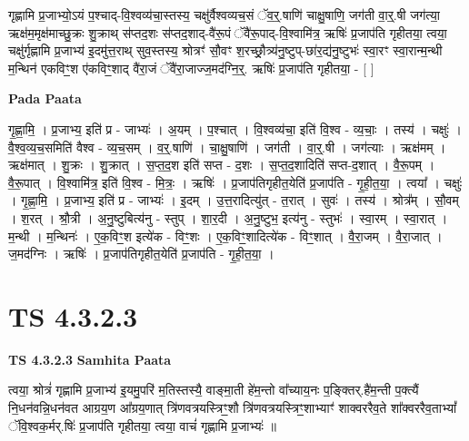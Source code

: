 \documentclass[17pt]{extarticle}
\begin{document}
गृह्णामि प्र॒जाभ्यो॒ऽयं प॒श्चाद्-वि॒श्वव्य॑चा॒स्तस्य॒ चक्षु॑र्वैश्वव्यच॒सं ॅव॒र्॒.षाणि॑ चाक्षु॒षाणि॒ जग॑ती वा॒र्॒.षी जग॑त्या॒ ऋक्ष॑म॒मृक्ष॑माच्छु॒क्रः शु॒क्राथ् स॑प्तद॒शः स॑प्तद॒शाद्-वै॑रू॒पं ॅवै॑रू॒पाद्-वि॒श्वामि॑त्र॒ ऋषिः॑ प्र॒जाप॑ति गृहीतया॒ त्वया॒ चक्षु॑र्गृह्णामि प्र॒जाभ्य॑ इ॒दमु॑त्त॒राथ् सुव॒स्तस्य॒ श्रोत्रꣳ॑ सौ॒वꣳ श॒रच्छ्रौ॒त्र्य॑नु॒ष्टुप्-छा॑र॒द्य॑नु॒ष्टुभः॑ स्वा॒रꣳ स्वा॒रान्म॒न्थी म॒न्थिन॑ एकविꣳ॒॒श ए॑कविꣳ॒॒शाद् वै॑रा॒जं ॅवै॑रा॒जाज्ज॒मद॑ग्नि॒र्॒. ऋषिः॑ प्र॒जाप॑ति गृहीतया॒ - [  ] \newline

\textbf{Pada Paata} \newline

गृ॒ह्णा॒मि॒ । प्र॒जाभ्य॒ इति॑ प्र - जाभ्यः॑ । अ॒यम् । प॒श्चात् । वि॒श्वव्य॑चा॒ इति॑ वि॒श्व - व्य॒चाः॒ । तस्य॑ । चक्षुः॑ । वै॒श्व॒व्य॒च॒समिति॑ वैश्व - व्य॒च॒सम् । व॒र्॒.षाणि॑ । चा॒क्षु॒षाणि॑ । जग॑ती । वा॒र्॒.षी । जग॑त्याः । ऋक्ष॑मम् । ऋक्ष॑मात् । शु॒क्रः । शु॒क्रात् । स॒प्त॒द॒श इति॑ सप्त - द॒शः । स॒प्त॒द॒शादिति॑ सप्त-द॒शात् । वै॒रू॒पम् । वै॒रू॒पात् । वि॒श्वामि॑त्र॒ इति॑ वि॒श्व - मि॒त्रः॒ । ऋषिः॑ । प्र॒जाप॑तिगृहीत॒येति॑ प्र॒जाप॑ति - गृ॒ही॒त॒या॒ । त्वया᳚ । चक्षुः॑ । गृ॒ह्णा॒मि॒ । प्र॒जाभ्य॒ इति॑ प्र - जाभ्यः॑ । इ॒दम् । उ॒त्त॒रादित्यु॑त् - त॒रात् । सुवः॑ । तस्य॑ । श्रोत्र᳚म् । सौ॒वम् । श॒रत् । श्रौ॒त्री । अ॒नु॒ष्टुबित्य॑नु - स्तुप् । शा॒र॒दी । अ॒नु॒ष्टुभ॒ इत्य॑नु - स्तुभः॑ । स्वा॒रम् । स्वा॒रात् । म॒न्थी । म॒न्थिनः॑ । ए॒क॒विꣳ॒॒श इत्ये॑क - विꣳ॒॒शः । ए॒क॒विꣳ॒॒शादित्ये॑क - विꣳ॒॒शात् । वै॒रा॒जम् । वै॒रा॒जात् । ज॒मद॑ग्निः । ऋषिः॑ । प्र॒जाप॑तिगृहीत॒येति॑ प्र॒जाप॑ति - गृ॒ही॒त॒या॒ ।  \newline




\section*{ TS 4.3.2.3 }

\textbf{TS 4.3.2.3 } \newline
\textbf{Samhita Paata} \newline

त्वया॒ श्रोत्रं॑ गृह्णामि प्र॒जाभ्य॑ इ॒यमु॒परि॑ म॒तिस्तस्यै॒ वाङ्मा॒ती हे॑म॒न्तो वा᳚च्याय॒नः प॒ङ्क्तिर्.है॑म॒न्ती प॒क्त्यैं नि॒धन॑वन्नि॒धन॑वत आग्रय॒ण आ᳚ग्रय॒णात् त्रि॑णवत्रयस्त्रिꣳ॒॒शौ त्रि॑णवत्रयस्त्रिꣳ॒॒शाभ्याꣳ॑ शाक्वररैव॒ते शा᳚क्वररैव॒ताभ्यां᳚ ॅवि॒श्वक॒र्मर्.षिः॑ प्र॒जाप॑ति गृहीतया॒ त्वया॒ वाचं॑ गृह्णामि प्र॒जाभ्यः॑ ॥ \newline
\end{document}
